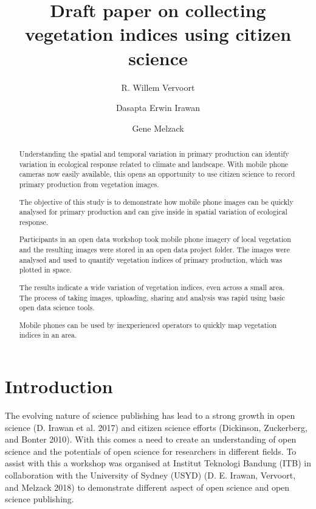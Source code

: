 \documentclass[]{elsarticle} %
\begin{document}
\begin{frontmatter}

  \title{Draft paper on collecting vegetation indices using citizen science}
    \author[a]{R. Willem Vervoort}
    \author[b]{Dasapta Erwin Irawan}
  
    \author[c]{Gene Melzack}
  
      \address[a]{The University of Sydney, Department, Street, City, State, Zip}
    \address[b]{ITB, Department, Street, City, State, Zip}
    \address[c]{The University of Sydney Library, Department, Street, City, State, Zip}
  
  \begin{abstract}
  Understanding the spatial and temporal variation in primary production
  can identify variation in ecological response related to climate and
  landscape. With mobile phone cameras now easily available, this opens an
  opportunity to use citizen science to record primary production from
  vegetation images.
  
  The objective of this study is to demonstrate how mobile phone images
  can be quickly analysed for primary production and can give inside in
  spatial variation of ecological response.
  
  Participants in an open data workshop took mobile phone imagery of local
  vegetation and the resulting images were stored in an open data project
  folder. The images were analysed and used to quantify vegetation indices
  of primary production, which was plotted in space.
  
  The results indicate a wide variation of vegetation indices, even across
  a small area. The process of taking images, uploading, sharing and
  analysis was rapid using basic open data science tools.
  
  Mobile phones can be used by inexperienced operators to quickly map
  vegetation indices in an area.
  \end{abstract}
  
 \end{frontmatter}

\section{Introduction}\label{introduction}

The evolving nature of science publishing has lead to a strong growth in
open science (D. Irawan et al. 2017) and citizen science efforts
(Dickinson, Zuckerberg, and Bonter 2010). With this comes a need to
create an understanding of open science and the potentials of open
science for researchers in different fields. To assist with this a
workshop was organised at Institut Teknologi Bandung (ITB) in
collaboration with the University of Sydney (USYD) (D. E. Irawan,
Vervoort, and Melzack 2018) to demonstrate different aspect of open
science and open science publishing.
\end{document}
